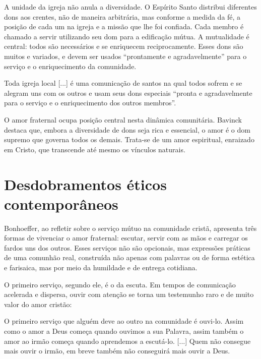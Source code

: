 A unidade da igreja não anula a diversidade. O Espírito Santo distribui diferentes dons aos crentes, não de maneira arbitrária, mas conforme a medida da fé, a posição de cada um na igreja e a missão que lhe foi confiada. \cite{bavinck2012} Cada membro é chamado a servir utilizando seu dom para a edificação mútua. A mutualidade é central: todos são necessários e se enriquecem reciprocamente. Esses dons são muitos e variados, e devem ser usados ``prontamente e agradavelmente'' para o serviço e o enriquecimento da comunidade.\cite{bavinck2012}

\begin{citacao}
    Toda igreja local [...] é uma comunicação de santos na qual todos sofrem e se alegram uns com os outros e usam seus dons especiais ``pronta e agradavelmente para o serviço e o enriquecimento dos outros membros''. \cite[p.~380]{bavinck2012}
\end{citacao}

O amor fraternal ocupa posição central nesta dinâmica comunitária. Bavinck destaca que, embora a diversidade de dons seja rica e essencial, o amor é o dom supremo que governa todos os demais. \cite[p.~304]{bavinck2012} Trata-se de um amor espiritual, enraizado em Cristo, que transcende até mesmo os vínculos naturais. \cite[p.~304]{bavinck2012}

\section{Desdobramentos éticos contemporâneos}

Bonhoeffer, ao refletir sobre o serviço mútuo na comunidade cristã, apresenta três formas de vivenciar o amor fraternal: escutar, servir com as mãos e carregar os fardos uns dos outros. Esses serviços não são opcionais, mas expressões práticas de uma comunhão real, construída não apenas com palavras ou de forma estética e farisaica, mas por meio da humildade e de entrega cotidiana.

O primeiro serviço, segundo ele, é o da escuta. Em tempos de comunicação acelerada e dispersa, ouvir com atenção se torna um testemunho raro e de muito valor do amor cristão:

\begin{citacao}
    O primeiro serviço que alguém deve ao outro na comunidade é ouvi-lo. Assim como o amor a Deus começa quando ouvimos a sua Palavra, assim também o amor ao irmão começa quando aprendemos a escutá-lo. [...] Quem não consegue mais ouvir o irmão, em breve também não conseguirá mais ouvir a Deus. \cite[pp.~75--76]{bonhoeffer1997}
\end{citacao}

